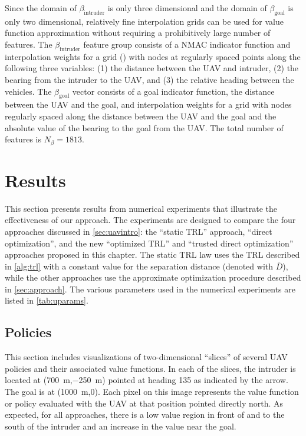 Since the domain of $\beta_\text{intruder}$ is only three dimensional and the domain of $\beta_\text{goal}$ is only two dimensional, relatively fine interpolation grids can be used for value function approximation without requiring a prohibitively large number of features. The $\beta_\text{intruder}$ feature group consists of a NMAC indicator function and interpolation weights for a grid () with nodes at regularly spaced points along the following three variables: (1) the distance between the UAV and intruder, (2) the bearing from the intruder to the UAV, and (3) the relative heading between the vehicles. The $\beta_\text{goal}$ vector consists of a goal indicator function, the distance between the UAV and the goal, and interpolation weights for a grid
with nodes regularly spaced along the distance between the UAV and the goal and the absolute value of the bearing to the goal from the UAV. The total number of features is $N_\beta = 1813$.


\section{Results} \label{sec:results}

This section presents results from numerical experiments that illustrate the effectiveness of our approach. The experiments are designed to compare the four approaches discussed in \cref{sec:uavintro}: the ``static TRL'' approach, ``direct optimization'', and the new ``optimized TRL'' and ``trusted direct optimization'' approaches proposed in this chapter. The static TRL law uses the TRL described in \cref{alg:trl} with a constant value for the separation distance (denoted with $\bar{D}$), while the other approaches use the approximate optimization procedure described in \cref{sec:approach}. The various parameters used in the numerical experiments are listed in \cref{tab:uparams}.

\subsection{Policies}

This section includes visualizations of two-dimensional ``slices'' of several UAV policies and their associated value functions. In each of the slices, the intruder is located at (\SI{700}{m},\SI{-250}{m}) pointed at heading 135 as indicated by the arrow. The goal is at (\SI{1000}{m},\num{0}). Each pixel on this image represents the value function or policy evaluated with the UAV at that position pointed directly north. As expected, for all approaches, there is a low value region in front of and to the south of the intruder and an increase in the value near the goal.

